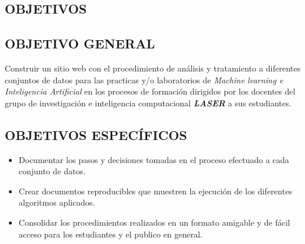 \begin{center}
\section{OBJETIVOS}
\end{center}
\subsection{OBJETIVO GENERAL}

\noindent Construir un sitio web con el procedimiento de an\'alisis y tratamiento a diferentes conjuntos de datos para las practicas y/o laboratorios de \textit{Machine learning e Inteligencia Artificial} en los procesos de formaci\'on dirigidos por los docentes del grupo de investigaci\'on e inteligencia computacional \textbf{\textit{LASER}} a sus estudiantes.

\subsection{OBJETIVOS ESPECÍFICOS}
	\begin{itemize}
		\item Documentar los pasos y decisiones tomadas en el proceso efectuado a cada conjunto de datos.
		\item Crear documentos reproducibles que muestren la ejecuci\'on de los diferentes algoritmos aplicados. 
		\item Consolidar los procedimientos realizados en un formato amigable y de f\'acil acceso para los estudiantes y el publico en general.
	\end{itemize}